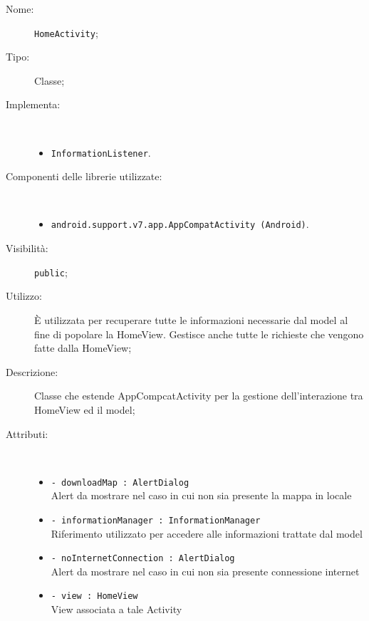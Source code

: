 \documentclass[../DefinizioneDiProdotto.tex]{subfiles}
\begin{document}
\begin{description}
	\item[Nome:] \texttt{HomeActivity};
	\item[Tipo:] Classe;
	\item[Implementa:] \
	\begin{itemize}
		\item \texttt{InformationListener}.
		
	\end{itemize}
	\item[Componenti delle librerie utilizzate:] \
	\begin{itemize}
		\item \texttt{android.support.v7.app.AppCompatActivity (Android)}.
		
	\end{itemize}
	\item[Visibilità:] \texttt{public};
	\item[Utilizzo:] È utilizzata per recuperare tutte le informazioni necessarie dal model al fine di popolare la HomeView. Gestisce anche tutte le richieste che vengono fatte dalla HomeView;
	\item[Descrizione:] Classe che estende AppCompcatActivity per la gestione dell'interazione tra HomeView ed il model;
	\item[Attributi:] \
	\begin{itemize}
		\item \texttt{- downloadMap : AlertDialog}\\
		Alert da mostrare nel caso in cui non sia presente la mappa in locale
		
		\item \texttt{- informationManager : InformationManager}\\
		Riferimento utilizzato per accedere alle informazioni trattate dal model
		
		\item \texttt{- noInternetConnection : AlertDialog}\\
		Alert da mostrare nel caso in cui non sia presente connessione internet
		
		\item \texttt{- view : HomeView}\\
		View associata a tale Activity
		

\end{itemize}
\end{description}
\end{document}
